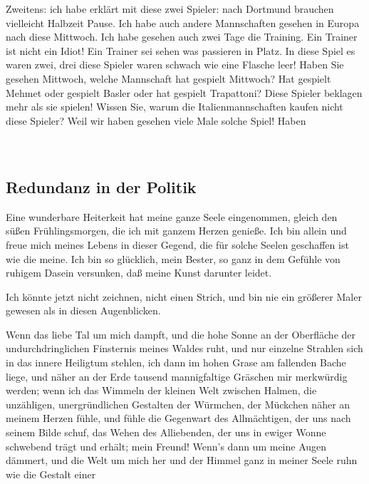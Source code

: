 \documentclass[a4paper,11pt]{article}
\begin{document}
Zweitens: ich habe erklärt mit diese zwei Spieler: nach
Dortmund brauchen vielleicht Halbzeit Pause.
Ich habe auch andere Mannschaften gesehen in Europa nach diese Mittwoch.
Ich habe gesehen auch zwei Tage die Training.
Ein Trainer ist nicht ein Idiot! Ein Trainer sei sehen was passieren in Platz.
In diese Spiel es waren zwei, drei diese Spieler waren schwach wie
eine Flasche leer!
Haben Sie gesehen Mittwoch, welche Mannschaft hat gespielt Mittwoch?
Hat gespielt Mehmet oder gespielt Basler oder hat gespielt Trapattoni?
Diese Spieler beklagen mehr als sie spielen!
Wissen Sie, warum die Italienmannschaften kaufen nicht diese Spieler?
Weil wir haben gesehen viele Male solche Spiel! Haben \\
\\
\\


 \subsection{ Redundanz in der Politik}

Eine wunderbare Heiterkeit hat meine ganze Seele eingenommen, gleich
den süßen Frühlingsmorgen, die ich mit ganzem Herzen genieße.
Ich bin allein und freue mich meines Lebens in dieser Gegend,
die für solche Seelen geschaffen ist wie die meine.
Ich bin so glücklich, mein Bester, so ganz in dem Gefühle von
ruhigem Dasein versunken, daß meine Kunst darunter leidet.

Ich könnte jetzt nicht zeichnen, nicht einen Strich, und bin nie
ein größerer Maler gewesen als in diesen Augenblicken.

Wenn das liebe Tal um mich dampft, und die hohe Sonne an der
Oberfläche der undurchdringlichen Finsternis meines Waldes ruht,
und nur einzelne Strahlen sich in das innere Heiligtum stehlen,
ich dann im hohen Grase am fallenden Bache liege, und näher an der
Erde tausend mannigfaltige Gräschen mir merkwürdig werden; wenn
ich das Wimmeln der kleinen Welt zwischen Halmen, die unzähligen,
unergründlichen Gestalten der Würmchen, der Mückchen näher an meinem
Herzen fühle, und fühle die Gegenwart des Allmächtigen, der uns
nach seinem Bilde schuf, das Wehen des Alliebenden, der uns in
ewiger Wonne schwebend trägt und erhält; mein Freund!
Wenn's dann um meine Augen dämmert, und die Welt um mich her und der
Himmel ganz in meiner Seele ruhn wie die Gestalt einer \\
\\
\\
\\
\\
\end{document}
